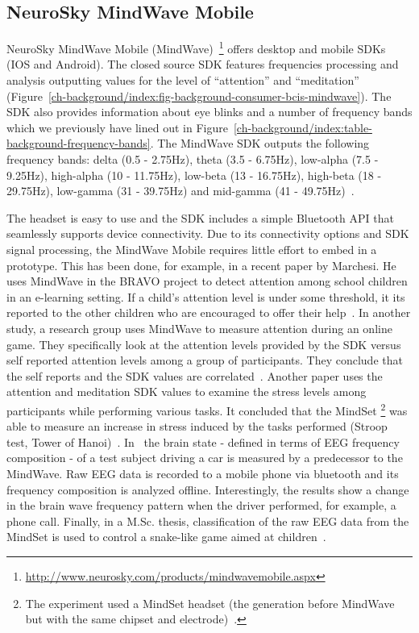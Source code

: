 \documentclass[a4paper,10pt,english,lof,lot,twoside]{puthesis}
\begin{document}
\subsection{NeuroSky MindWave Mobile}
\label{ch-background/index:neurosky-mindwave-mobile}\label{ch-background/index:ch-background-mindwave}
NeuroSky MindWave Mobile (MindWave) \footnote{
\href{http://www.neurosky.com/products/mindwavemobile.aspx}{http://www.neurosky.com/products/mindwavemobile.aspx}
} offers
desktop and mobile SDKs (IOS and Android). The closed source SDK features
frequencies processing and analysis outputting values for the level of
``attention'' and ``meditation'' \cite{neurosky_brain_2009} (Figure \ref{ch-background/index:fig-background-consumer-bcis-mindwave}). The SDK also provides information
about eye blinks and a number of frequency bands which we previously have lined
out in Figure \ref{ch-background/index:table-background-frequency-bands}. The
MindWave SDK outputs the following frequency bands: delta (0.5 - 2.75Hz), theta (3.5 - 6.75Hz),
low-alpha (7.5 - 9.25Hz), high-alpha (10 - 11.75Hz), low-beta (13 - 16.75Hz),
high-beta (18 - 29.75Hz), low-gamma (31 - 39.75Hz) and mid-gamma (41 - 49.75Hz) \cite{neurosky_thinkgear_2012}.

The headset is easy to use and the SDK includes a simple Bluetooth API that
seamlessly supports device connectivity. Due to its connectivity options and SDK
signal processing, the MindWave Mobile requires little effort to embed in a
prototype. This has been done, for example, in a recent paper by Marchesi.
He uses MindWave in the
BRAVO project to detect attention among school children in an e-learning
setting. If a child's attention level is under some threshold, it its reported
to the other children who are encouraged to offer their help \cite{marchesi_bravo:_2013}. In another study, a research group uses
MindWave to measure
attention during an online game. They specifically look at the attention
levels provided by the SDK versus self reported attention levels among a group of
participants. They conclude that the self reports and the SDK values are correlated \cite{hutchison_assessing_2009}. Another paper uses the attention and
meditation SDK values to examine the stress levels among participants while
performing various tasks. It concluded that the
MindSet \footnote{
The experiment used a MindSet headset (the generation before
MindWave but with the same chipset and electrode) \cite{crowley_evaluating_2010}.
} was able to measure an increase in stress
induced by the tasks performed (Stroop test, Tower of Hanoi) \cite{crowley_evaluating_2010}.
In \cite{yasui_brainwave_2009}
the brain state - defined in terms
of EEG frequency composition - of a test subject driving a car is measured by
a predecessor to the MindWave. Raw EEG data is recorded to a mobile phone via
bluetooth and its frequency composition is analyzed offline.
Interestingly, the results show a change in the brain wave frequency pattern
when the driver performed, for example, a phone call.
Finally, in a M.Sc. thesis, classification of the raw EEG data from the MindSet
is used to control a snake-like game aimed at children \cite{larsen_classification_2011}.
\end{document}
